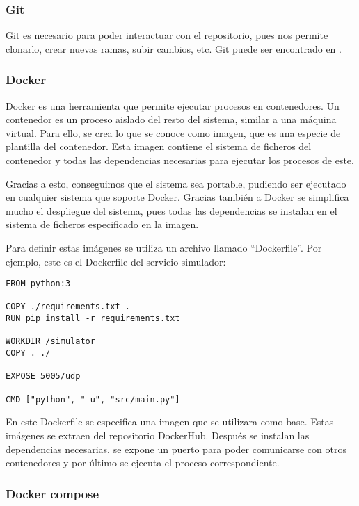 \subsubsection{Git}

Git es necesario para poder interactuar con el repositorio, pues nos permite clonarlo, crear nuevas ramas,
subir cambios, etc. Git puede ser encontrado en \cite{git}.


\subsubsection{Docker}

Docker \cite{docker-pag} es una herramienta que permite ejecutar procesos en contenedores. Un contenedor es un proceso aislado del 
resto del sistema, similar a una máquina virtual. Para ello, se crea lo que se conoce como imagen, que es una especie 
de plantilla del contenedor. Esta imagen contiene el sistema de ficheros del contenedor y todas las dependencias 
necesarias para ejecutar los procesos de este.

Gracias a esto, conseguimos que el sistema sea portable, pudiendo ser ejecutado en cualquier sistema que soporte 
Docker. Gracias también a Docker se simplifica mucho el despliegue del sistema, pues todas las dependencias 
se instalan en el sistema de ficheros especificado en la imagen.

Para definir estas imágenes se utiliza un archivo llamado ``Dockerfile''. Por ejemplo, este es el Dockerfile del 
servicio simulador:
\begin{lstlisting}
FROM python:3

COPY ./requirements.txt .
RUN pip install -r requirements.txt

WORKDIR /simulator
COPY . ./

EXPOSE 5005/udp

CMD ["python", "-u", "src/main.py"]
\end{lstlisting}

En este Dockerfile se especifica una imagen que se utilizara como base. Estas imágenes se extraen del repositorio 
DockerHub. Después se instalan las dependencias necesarias, se expone un puerto para poder comunicarse con otros 
contenedores y por último se ejecuta el proceso correspondiente.

\subsubsection{Docker compose}

